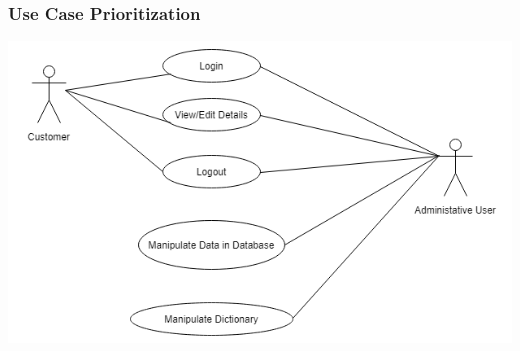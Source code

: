 \documentclass[a4paper,10pt]{article}
\begin{document}
	\subsubsection{Use Case Prioritization} 
		 \includegraphics[scale=0.62]{Diagrams/GeneralClass.png}\\
\end{document}
